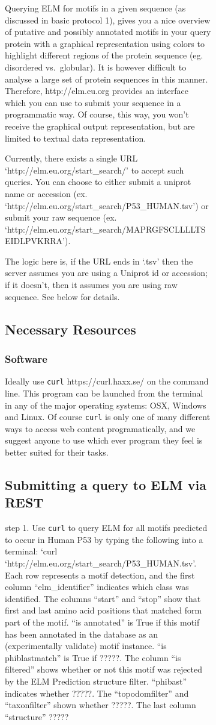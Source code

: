 {\begin{figure}[h!]
{{\begin{figure}[h!]
{{Querying ELM for motifs in a given sequence (as discussed in basic
protocol 1), gives you a nice overview of putative and possibly
annotated motifs in your query protein with a graphical representation
using colors to highlight different regions of the protein sequence (eg.
disordered vs.~globular). It is however difficult to analyse a large set
of protein sequences in this manner. Therefore, http://elm.eu.org
provides an interface which you can use to submit your sequence in a
programmatic way. Of course, this way, you won't receive the graphical
output representation, but are limited to textual data representation.

Currently, there exists a single URL `http://elm.eu.org/start\_search/'
to accept such queries. You can choose to either submit a uniprot name
or accession (ex. `http://elm.eu.org/start\_search/P53\_HUMAN.tsv') or
submit your raw sequence (ex.
`http://elm.eu.org/start\_search/MAPRGFSCLLLLTSEIDLPVKRRA').

The logic here is, if the URL ends in `.tsv' then the server assumes you
are using a Uniprot id or accession; if it doesn't, then it assumes you
are using raw sequence. See below for details.

\subsection{Necessary Resources}\label{necessary-resources-2}

\subsubsection{Software}\label{software}

Ideally use \texttt{curl} https://curl.haxx.se/ on the command line.
This program can be launched from the terminal in any of the major
operating systems: OSX, Windows and Linux. Of course \texttt{curl} is
only one of many different ways to access web content programatically,
and we suggest anyone to use which ever program they feel is better
suited for their tasks.

\subsection{Submitting a query to ELM via
REST}\label{submitting-a-query-to-elm-via-rest}

step 1. Use \texttt{curl} to query ELM for all motifs predicted to occur
in Human P53 by typing the following into a terminal: `curl
`http://elm.eu.org/start\_search/P53\_HUMAN.tsv'. Each row represents a
motif detection, and the first column ``elm\_identifier'' indicates
which class was identified. The columns ``start'' and ``stop'' show that
first and last amino acid positions that matched form part of the motif.
``is annotated'' is True if this motif has been annotated in the
database as an (experimentally validate) motif instance. ``is
phiblastmatch'' is True if ?????. The column ``is filtered'' shows
whether or not this motif was rejected by the ELM Prediction structure
filter. ``phibast'' indicates whether ?????. The ``topodomfilter'' and
``taxonfilter'' shown whether ?????. The last column ``structure'' ?????

}}
\end{figure}}}
\end{figure}}
